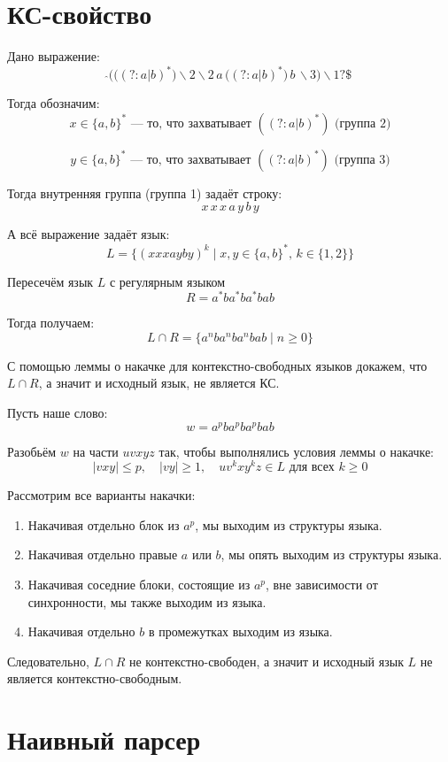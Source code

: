 \documentclass[a4paper, 14pt]{extarticle}
\begin{document}
\section{КС-свойство}
Дано выражение:
\[
\hat{ } \Big( \big( (?: a | b)^* \big) \backslash 2 \backslash 2 \, a \, \big( (?: a | b)^* \big) \, b \, \backslash 3 \Big) \backslash 1? \$
\]

Тогда обозначим:
\[
x \in \{a,b\}^* \text{ — то, что захватывает } ((?:a|b)^*) \text{ (группа 2)}
\]

\[
y \in \{a,b\}^* \text{ — то, что захватывает } ((?:a|b)^*) \text{ (группа 3)}
\]

Тогда внутренняя группа (группа 1) задаёт строку:
\[
x\, x\, x\, a\, y\, b\, y
\]

А всё выражение задаёт язык:
\[
L = \{ (x x x a y b y)^k \mid x,y \in \{a,b\}^*, \, k \in \{1,2\} \}
\]

Пересечём язык $L$ с регулярным языком 
\[
R = a^* b a^* b a^* b a b
\]

Тогда получаем:
\[
L \cap R = \{ a^n b a^n b a^n b a b \mid n \ge 0 \}
\]

С помощью леммы о накачке для контекстно-свободных языков докажем, что $L\cap R$, а значит и исходный язык, не является КС.  

Пусть наше слово:
\[
w = a^p b a^p b a^p b a b
\]

Разобьём $w$ на части $uvxyz$ так, чтобы выполнялись условия леммы о накачке:
\[
|vxy| \le p, \quad |vy| \ge 1, \quad uv^kxy^kz \in L \text{ для всех } k \ge 0
\]

Рассмотрим все варианты накачки:
\begin{enumerate}
    \item Накачивая отдельно блок из $a^p$, мы выходим из структуры языка.
    \item Накачивая отдельно правые $a$ или $b$, мы опять выходим из структуры языка.
    \item Накачивая соседние блоки, состоящие из $a^p$, вне зависимости от синхронности, мы также выходим из языка.
    \item Накачивая отдельно $b$ в промежутках выходим из языка.
\end{enumerate}

Следовательно, $L \cap R$ не контекстно-свободен, а значит и исходный язык $L$ не является контекстно-свободным.

\section{Наивный парсер}
\end{document}
